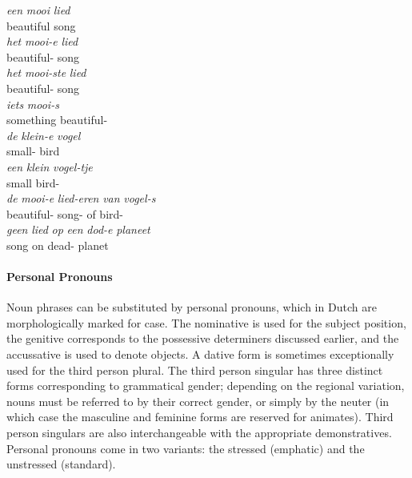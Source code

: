 \begin{exe}
\ex 
\begin{xlist}
\ex\label{gloss:simple_np}
\gll \textit{een} \textit{mooi} \textit{lied}\\
 beautiful song\\
\ex\label{gloss:adjective_definite_n}
\gll \textit{het} \textit{mooi-e} \textit{lied}\\
 beautiful- song\\
\ex\label{gloss:superlative}
\gll \textit{het} \textit{mooi-ste} \textit{lied}\\
 beautiful- song\\
\ex\label{gloss:partitive}
\gll \textit{iets} \textit{mooi-s}\\
something beautiful-\\
\ex\label{gloss:adjective_definite_nn}
\gll \textit{de} \textit{klein-e} \textit{vogel}\\
 small- bird\\
\ex\label{gloss:diminutive}
\gll \textit{een} \textit{klein} \textit{vogel-tje}\\
 small bird-\\
\ex\label{gloss:genitive}
\gll \textit{de} \textit{mooi-e} \textit{lied-eren} \textit{van} \textit{vogel-s}\\
 beautiful- song- of bird-\\
\ex\label{gloss:adjp}
\gll \textit{geen} \textit{lied} \textit{op} \textit{een} \textit{dod-e} \textit{planeet}\\
 song on  dead- planet\\
\end{xlist}
\end{exe}

\paragraph{Personal Pronouns}
Noun phrases can be substituted by personal pronouns, which in Dutch are morphologically marked for case.
The nominative is used for the subject position, the genitive corresponds to the possessive determiners discussed earlier, and the accussative is used to denote objects.
A dative form is sometimes exceptionally used for the third person plural.
The third person singular has three distinct forms corresponding to grammatical gender; 
depending on the regional variation, nouns must be referred to by their correct gender, or simply by the neuter (in which case the masculine and feminine forms are reserved for animates).
Third person singulars are also interchangeable with the appropriate demonstratives.
Personal pronouns come in two variants: the stressed (emphatic) and the unstressed (standard).

